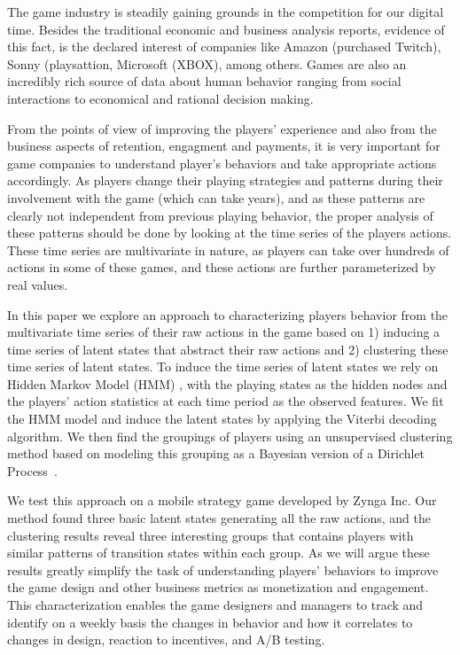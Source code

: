 The game industry is steadily gaining grounds in the competition for our digital time. Besides the traditional economic and business analysis reports, evidence of this fact, is the declared interest of companies like Amazon (purchased Twitch), Sonny (playsattion, Microsoft (XBOX), among others.  Games are also an incredibly rich source of data about human behavior ranging from social interactions to economical and rational decision making.

From the points of view of  improving the players' experience  and also from the business aspects of retention, engagment  and payments,  it is very important for game companies to understand  player's behaviors and take appropriate actions accordingly. As players change their playing strategies and patterns during their involvement with the game (which can take years), and as these patterns are clearly not independent from previous playing behavior, the proper analysis of these patterns should be done by looking at the time series of the players actions.  These time series are multivariate in nature, as players can take over hundreds of actions in some of these games, and these actions are further parameterized by real values.

In this paper we explore an approach to characterizing players behavior from the multivariate time series of their raw actions in the game based on 
1) inducing a time series of latent states that abstract their raw actions and 2) clustering these time series of latent states.  To induce the time series of latent states we rely on  Hidden Markov Model (HMM) \cite{hmm}, with the playing states as 
the hidden nodes and the players' action statistics at each time period as the observed features.  We fit the HMM model and induce the latent  states by applying the Viterbi decoding algorithm.  We then find the groupings of players using an unsupervised clustering method based on modeling this grouping as a Bayesian version of a Dirichlet Process~\cite{}.

We test this approach on a mobile strategy game developed by Zynga Inc. %
Our method found three basic latent  states generating all the raw actions, and  the clustering results reveal three 
interesting groups that contains players with similar patterns of transition states within each group.
As we will argue these results greatly simplify the task of  understanding players' behaviors to improve the game design and other business metrics as monetization and engagement. This characterization enables the game designers and managers to track and identify on a weekly basis the changes in behavior and how it correlates to changes in design, reaction to incentives, and A/B testing.  


